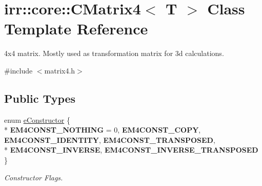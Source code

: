 \hypertarget{classirr_1_1core_1_1CMatrix4}{}\section{irr\+:\+:core\+:\+:C\+Matrix4$<$ T $>$ Class Template Reference}
\label{classirr_1_1core_1_1CMatrix4}


4x4 matrix. Mostly used as transformation matrix for 3d calculations.  




{\ttfamily \#include $<$matrix4.\+h$>$}

\subsection*{Public Types}
\begin{DoxyCompactItemize}
\item 
enum \hyperlink{classirr_1_1core_1_1CMatrix4_a7bb79712227617f706ed57a34f3eb4fe}{e\+Constructor} \{ \\*
{\bfseries E\+M4\+C\+O\+N\+S\+T\+\_\+\+N\+O\+T\+H\+I\+NG} = 0, 
{\bfseries E\+M4\+C\+O\+N\+S\+T\+\_\+\+C\+O\+PY}, 
{\bfseries E\+M4\+C\+O\+N\+S\+T\+\_\+\+I\+D\+E\+N\+T\+I\+TY}, 
{\bfseries E\+M4\+C\+O\+N\+S\+T\+\_\+\+T\+R\+A\+N\+S\+P\+O\+S\+ED}, 
\\*
{\bfseries E\+M4\+C\+O\+N\+S\+T\+\_\+\+I\+N\+V\+E\+R\+SE}, 
{\bfseries E\+M4\+C\+O\+N\+S\+T\+\_\+\+I\+N\+V\+E\+R\+S\+E\+\_\+\+T\+R\+A\+N\+S\+P\+O\+S\+ED}
 \}\hypertarget{classirr_1_1core_1_1CMatrix4_a7bb79712227617f706ed57a34f3eb4fe}{}\label{classirr_1_1core_1_1CMatrix4_a7bb79712227617f706ed57a34f3eb4fe}
\begin{DoxyCompactList}\small\item\em Constructor Flags. \end{DoxyCompactList}
\end{DoxyCompactItemize}
